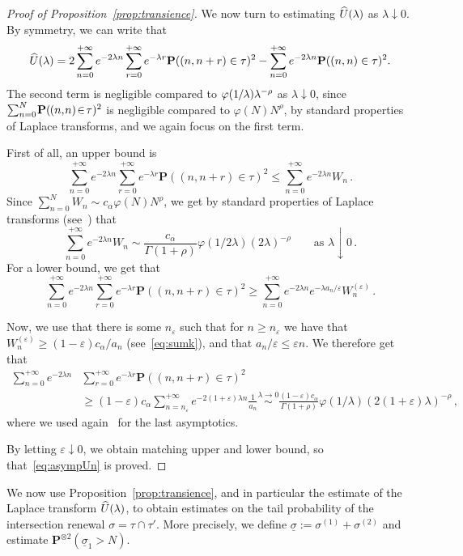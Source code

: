 \documentclass[10pt]{amsart}
\theoremstyle{definition}\newtheorem{defi}[theo]{Definition}\newtheorem{rema}[theo]{Remark}\newtheorem{exam}[theo]{Example}\newtheorem{exem}[theo]{Example}\newtheorem{nota}[theo]{Notation}
\newcommand{\ga}{\alpha}
\newcommand{\gep}{\varepsilon}
\newcommand{\gl}{\lambda}
\let\oldhat\hat
\renewcommand*{\hat}[1]{\mathchoice{\widehat{#1}}{\widehat{#1}}{\oldhat{#1}}{\oldhat{#1}}}
\newcommand{\bP}{\ensuremath{\mathbf{P}}}
\newcommand*{\mk}{\mkern -1mu}
\newcommand*{\Mk}{\mkern -2mu}
\newenvironment{proofc}[1][\proofname]{\begin{proof}[{#1}]}{\end{proof}}
\begin{document}
\begin{appendix}
\begin{proofc}[Proof of Proposition~\ref{prop:transience}]
We now turn to estimating $\hat U (\gl)$ as $\gl \downarrow 0$. By symmetry, we can write that
\[
\hat U(\gl) = 2\sum_{n=0}^{+\infty} e^{-2 \gl n}\sum_{r=0}^{+\infty} e^{-\gl r} \bP((n,n+r)\in\tau)^2 - \sum_{n=0}^{+\infty} e^{-2\gl n} \bP((n,n)\in\tau)^2.
\]
The second term is negligible compared to $ \varphi(1\mk/\mk\gl) \gl^{-\rho}$ as $\gl \!\downarrow\! 0$, since $\sum_{n=0}^N\Mk \bP(\mk{(n,\Mk n)\!\in\!\tau})^2$ is negligible compared to $ \varphi(N)N^{\rho}$, by standard properties of Laplace transforms, and we again focus on the first term.

First of all, an upper bound is
\[
\sum_{n=0}^{+\infty} e^{-2 \gl n}\sum_{r=0}^{+\infty} e^{-\gl r} \bP((n,n+r)\in\tau)^2 \leq \sum_{n=0}^{+\infty} e^{-2\gl n} W_n\,.
\]
Since $\sum_{n=0}^{N} W_n \sim c_{\ga} \varphi(N)N^{\rho}$, we get by standard properties of Laplace transforms (see~\cite[Corollary~1.7.3]{cf:BGT}) that
\[
\sum_{n=0}^{+\infty} e^{-2\gl n} W_n \sim \frac{c_\ga}{\Gamma(1+\rho)} \varphi(1/2\gl) (2\gl)^{-\rho} \qquad \text{as } \gl \downarrow 0\,.
\]
For a lower bound, we get that
\[
\sum_{n=0}^{+\infty} e^{-2 \gl n}\sum_{r=0}^{+\infty} e^{-\gl r} \bP((n,n+r)\in\tau)^2 \geq \sum_{n=0}^{+\infty} e^{-2\gl n} e^{-\gl a_n /\gep} W_n^{(\gep)}\,.
\]

Now, we use that there is some $n_{\gep}$ such that for $n\geq n_{\gep}$ we have that $W_n^{(\gep)}\geq (1-\gep) c_{\ga} /a_n$ (see~\eqref{eq:sumk}), and that $a_n/\gep \leq \gep n$. We therefore get that
\begin{align*}
\sum_{n=0}^{+\infty} e^{-2 \gl n}&\sum_{r=0}^{+\infty} e^{-\gl r} \bP((n,n+r)\in\tau)^2 \\
& \geq (1-\gep) c_\ga \sum_{n=n_{\gep}}^{+\infty} e^{-2(1+\gep)\gl n} \frac{1}{a_n} \stackrel{\gl\to 0}{\sim} \frac{(1-\gep) c_\ga}{\Gamma(1+\rho)} \varphi(1/\gl) (2(1+\gep) \gl)^{-\rho}\,,
\end{align*}
where we used again~\cite[Corollary~1.7.3]{cf:BGT} for the last asymptotics.

By letting $\gep \downarrow 0$, we obtain matching upper and lower bound, so that~\eqref{eq:asympUn} is proved.
\end{proofc}

We now use Proposition~\ref{prop:transience}, and in particular the estimate of the Laplace transform $\hat U(\gl)$, to obtain estimates on the tail probability of the intersection renewal $\sigma=\tau\cap \tau'$. More precisely, we define $\underline{\sigma}:= \sigma^{(1)} + \sigma^{(2)}$ and estimate $\bP^{\otimes 2}(\underline \sigma _1 >N)$.


\end{appendix}
\end{document}
